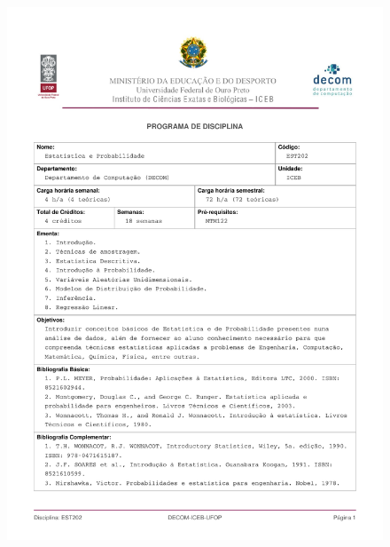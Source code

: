 \begin{figure}[p]
	\centering 
	\includegraphics[scale=0.7]{capitulos/anexo1-programas-disciplina/p44.pdf}
\end{figure}

